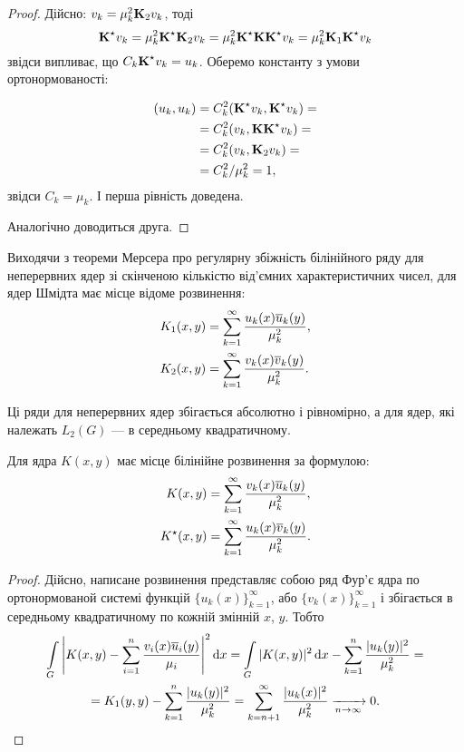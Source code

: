 \begin{proof}
	Дійсно: $v_k=\mu_k^2\bf{K}_2v_k$, тоді
	\begin{equation}
		\bf{K}^\star v_k=\mu_k^2\bf{K}^\star \bf{K}_2v_k=\mu_k^2\bf{K}^\star \bf{K}\bf{K}^\star v_k=\mu_k^2\bf{K}_1\bf{K}^\star v_k
	\end{equation}
	звідси випливає, що $C_k\bf{K}^\star v_k=u_k$. Оберемо константу з умови ортонормованості:

	\begin{equation}
		\begin{aligned}
		(u_k, u_k) &= C_k^2 (\bf{K}^\star v_k, \bf{K}^\star v_k)=\\
		&=C_k^2(v_k,\bf{K}\bf{K}^\star v_k)=\\
		&=C_k^2(v_k,\bf{K}_2v_k)=\\\
		&=C_k^2/\mu_k^2=1,
		\end{aligned}
	\end{equation}
	звідси $C_k = \mu_k$. І перша рівність доведена. \medskip

	Аналогічно доводиться друга.
\end{proof}

Виходячи з теореми Мерсера про регулярну збіжність білінійного ряду для неперервних ядер зі скінченою кількістю від'ємних характеристичних чисел, для ядер Шмідта має місце відоме розвинення:
\begin{align}
	K_1(x,y)&=\Sum_{k=1}^\infty \dfrac{u_k(x)\overline u_k(y)}{\mu_k^2}, \\
	K_2(x,y)&=\Sum_{k=1}^\infty \dfrac{v_k(x)\overline v_k(y)}{\mu_k^2}.
\end{align}

Ці ряди для неперервних ядер збігається абсолютно і рівномірно, а для ядер, які належать $L_2(G)$ --- в середньому квадратичному.

\begin{proposition}
	\label{proposition:2.6.4}
	Для ядра $K(x,y)$ має місце білінійне розвинення за формулою:
	\begin{align}
		K(x,y)&=\Sum_{k=1}^\infty \dfrac{v_k(x)\overline u_k(y)}{\mu_k^2}, \\
		K^\star (x,y)&=\Sum_{k=1}^\infty \dfrac{u_k(x)\overline v_k(y)}{\mu_k^2}.
	\end{align}
\end{proposition}

\begin{proof}
	Дійсно, написане розвинення представляє собою ряд Фур'є ядра по ортонормованой системі функцій $\{u_k(x)\}_{k=1}^\infty$, або $\{v_k(x)\}_{k=1}^\infty$ і
	збігається в середньому квадратичному 
	по кожній змінній $x$, $y$. Тобто
	\begin{multline}
		\Int_G \left| K(x,y) - \Sum_{i=1}^n \dfrac{v_i(x) \overline u_i(y)}{\mu_i} \right|^2 \diff x = \Int_G |K(x, y)|^2 \diff x - \Sum_{k=1}^n \dfrac{|u_k(y)|^2}{\mu_k^2} = \\
		= K_1(y, y) - \Sum_{k=1}^n \dfrac{|u_k(y)|^2}{\mu_k^2} = \Sum_{k=n+1}^\infty \dfrac{|u_k(x)|^2}{\mu_k^2} \xrightarrow[n\to\infty]{} 0.
	\end{multline}
\end{proof}

